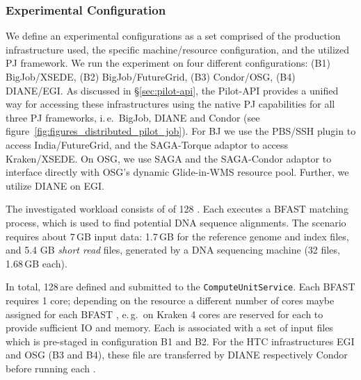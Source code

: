 \documentclass[conference]{IEEEtran}
\begin{document}

\subsubsection*{Experimental Configuration}


We define an experimental configurations as a set comprised of the
production infrastructure used, the specific machine/resource
configuration, and the utilized PJ framework.  We run the experiment
on four different configurations: (B1) BigJob/XSEDE, (B2)
BigJob/FutureGrid, (B3) Condor/OSG, (B4) DIANE/EGI. As discussed in
\S\ref{sec:pilot-api}, the Pilot-API provides a unified way for
accessing these infrastructures using the native PJ capabilities for
all three PJ frameworks, i.\,e.\ BigJob, DIANE and Condor (see
figure~\ref{fig:figures_distributed_pilot_job}).  For BJ we use the
PBS/SSH plugin to access India/FutureGrid, and the SAGA-Torque adaptor
to access Kraken/XSEDE. On OSG, we use SAGA and the SAGA-Condor
adaptor to interface directly with OSG's dynamic Glide-in-WMS resource
pool. Further, we utilize DIANE on
EGI. %

The investigated workload consists of of 128 \cus. Each \cu executes a
BFAST matching process, which is used to find potential DNA sequence
alignments. The scenario requires about 7\,GB input data: 1.7\,GB for
the reference genome and index files, and 5.4 GB \textit{short read}
files, generated by a DNA sequencing machine (32 files, 1.68\,GB
each).

In total, 128\,\cus are defined and submitted to the
\texttt{Compute\-Unit\-Service}. Each BFAST \cu requires 1 core;
depending on the resource a different number of cores maybe assigned
for each BFAST \cu, e.\,g.\ on Kraken 4 cores are reserved for each
\cu to provide sufficient IO and memory. Each \cu is associated with a
set of input files which is pre-staged in configuration B1 and
B2. For the HTC infrastructures EGI and OSG (B3 and B4),
these file are transferred by DIANE respectively Condor before running
each \cu.  %
\end{document}
